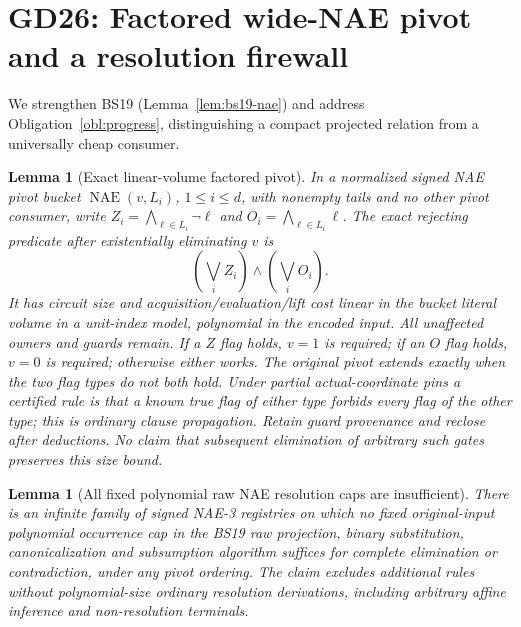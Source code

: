 \documentclass[11pt]{article}
\newtheorem{lemma}[theorem]{Lemma}
\begin{document}
\section{GD26: Factored wide-NAE pivot and a resolution firewall}\label{sec:gd26}
We strengthen BS19 (Lemma~\ref{lem:bs19-nae}) and address Obligation~\ref{obl:progress}, distinguishing a compact projected relation from a universally cheap consumer.
\begin{lemma}[Exact linear-volume factored pivot]\label{lem:gd26-gate}
In a normalized signed NAE pivot bucket $\operatorname{NAE}(v,L_i)$, $1\le i\le d$, with nonempty tails and no other pivot consumer, write $Z_i=\bigwedge_{\ell\in L_i}\neg\ell$ and $O_i=\bigwedge_{\ell\in L_i}\ell$. The exact rejecting predicate after existentially eliminating $v$ is
\[
  \left(\bigvee_i Z_i\right)\land\left(\bigvee_i O_i\right).
\]
It has circuit size and acquisition/evaluation/lift cost linear in the bucket literal volume in a unit-index model, polynomial in the encoded input. All unaffected owners and guards remain. If a $Z$ flag holds, $v=1$ is required; if an $O$ flag holds, $v=0$ is required; otherwise either works. The original pivot extends exactly when the two flag types do not both hold. Under partial actual-coordinate pins a certified rule is that a known true flag of either type forbids every flag of the other type; this is ordinary clause propagation. Retain guard provenance and reclose after deductions. No claim that subsequent elimination of arbitrary such gates preserves this size bound.
\end{lemma}
\begin{lemma}[All fixed polynomial raw NAE resolution caps are insufficient]\label{lem:gd26-res}
There is an infinite family of signed NAE-3 registries on which no fixed original-input polynomial occurrence cap in the BS19 raw projection, binary substitution, canonicalization and subsumption algorithm suffices for complete elimination or contradiction, under any pivot ordering. The claim excludes additional rules without polynomial-size ordinary resolution derivations, including arbitrary affine inference and non-resolution terminals.
\end{lemma}
\end{document}
